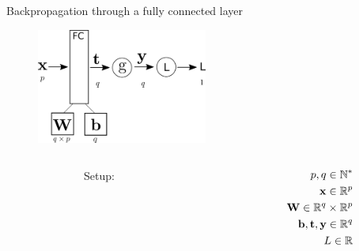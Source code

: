 \documentclass[xcolor=pdftex,dvipsnames,table,mathserif]{beamer}
\begin{document}
\begin{frame}{Backpropagation through a fully connected layer}
  \begin{figure}
    \includegraphics[width=0.5\textwidth]{bp_fc.png}
  \end{figure}

\begin{columns}
  \begin{column}{.5\textwidth}
  ~~~~~~~~~~~~~~Setup:
  \end{column}

  \begin{column}{.5\textwidth}
  \begin{eqnarray*}
    p, q \in \mathbb{N}^*\\
    \mathbf{x} \in \mathbb{R}^p \\
    \mathbf{W} \in \mathbb{R}^q \times \mathbb{R}^p \\
    \mathbf{b}, \mathbf{t}, \mathbf{y} \in \mathbb{R}^q \\
    L \in \mathbb{R}
  \end{eqnarray*}
  \end{column}
\end{columns}

\end{frame}
\end{document}
